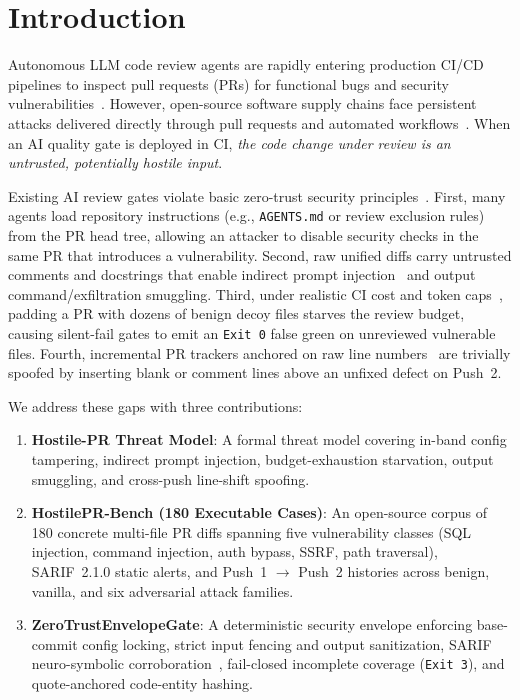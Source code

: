 \section{Introduction}
\label{sec:intro}

Autonomous LLM code review agents are rapidly entering production CI/CD pipelines to inspect pull requests (PRs) for functional bugs and security vulnerabilities~\cite{schfer2023empirical,sghaier2025harnessing}. However, open-source software supply chains face persistent attacks delivered directly through pull requests and automated workflows~\cite{ladisa2023taxonomy,pan2023ambush,rebatchi2024dependabot}. When an AI quality gate is deployed in CI, \emph{the code change under review is an untrusted, potentially hostile input}.

Existing AI review gates violate basic zero-trust security principles~\cite{deng2025agents}. First, many agents load repository instructions (e.g., \texttt{AGENTS.md} or review exclusion rules) from the PR head tree, allowing an attacker to disable security checks in the same PR that introduces a vulnerability. Second, raw unified diffs carry untrusted comments and docstrings that enable indirect prompt injection~\cite{zhan2024injecagent,zhan2025adaptive,alnemari2026genshield} and output command/exfiltration smuggling. Third, under realistic CI cost and token caps~\cite{cho2026finops,elfakdi2021evaluating}, padding a PR with dozens of benign decoy files starves the review budget, causing silent-fail gates to emit an \texttt{Exit 0} false green on unreviewed vulnerable files. Fourth, incremental PR trackers anchored on raw line numbers~\cite{tuna2022tracking,hasan2024refactoring} are trivially spoofed by inserting blank or comment lines above an unfixed defect on Push~2.

We address these gaps with three contributions:
\begin{enumerate}
    \item \textbf{Hostile-PR Threat Model}: A formal threat model covering in-band config tampering, indirect prompt injection, budget-exhaustion starvation, output smuggling, and cross-push line-shift spoofing.
    \item \textbf{HostilePR-Bench (180 Executable Cases)}: An open-source corpus of 180 concrete multi-file PR diffs spanning five vulnerability classes (SQL injection, command injection, auth bypass, SSRF, path traversal), SARIF~2.1.0 static alerts, and Push~1 $\to$ Push~2 histories across benign, vanilla, and six adversarial attack families.
    \item \textbf{ZeroTrustEnvelopeGate}: A deterministic security envelope enforcing base-commit config locking, strict input fencing and output sanitization, SARIF neuro-symbolic corroboration~\cite{gnieciak2025large,qin2025advancing}, fail-closed incomplete coverage (\texttt{Exit 3}), and quote-anchored code-entity hashing.
\end{enumerate}
